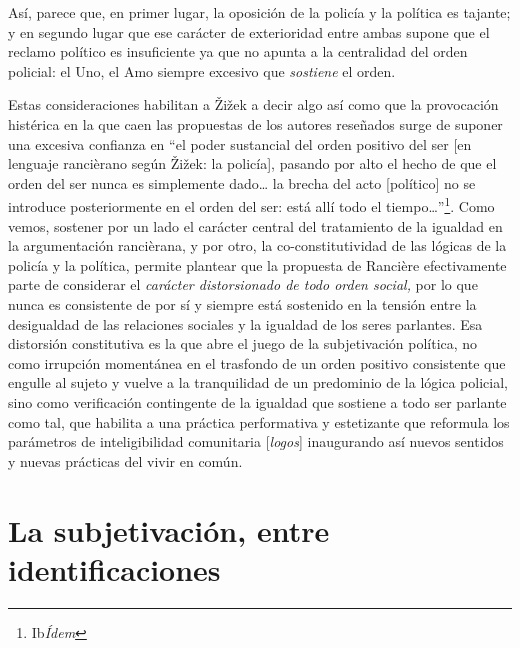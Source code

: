 Así, parece que, en primer lugar, la oposición de la policía y la política es tajante; y en segundo lugar que ese carácter de exterioridad entre ambas supone que el reclamo político es insuficiente ya que no apunta a la centralidad del orden policial: el Uno, el Amo siempre excesivo que \emph{sostiene} el orden.

Estas consideraciones habilitan a Žižek a decir algo así como que la provocación histérica en la que caen las propuestas de los autores reseñados surge de suponer una excesiva confianza en \enquote{el poder sustancial del orden positivo del ser {[}en lenguaje rancièrano según Žižek: la policía{]}, pasando por alto el hecho de que el orden del ser nunca es simplemente dado\ldots{} la brecha del acto {[}político{]} no se introduce posteriormente en el orden del ser: está allí todo el tiempo\ldots}\footnote{Ib\emph{Ídem}}. Como vemos, sostener por un lado el carácter central del tratamiento de la igualdad en la argumentación rancièrana, y por otro, la co-constitutividad de las lógicas de la policía y la política, permite plantear que la propuesta de Rancière efectivamente parte de considerar el \emph{carácter distorsionado de todo orden social,} por lo que nunca es consistente de por sí y siempre está sostenido en la tensión entre la desigualdad de las relaciones sociales y la igualdad de los seres parlantes. Esa distorsión constitutiva es la que abre el juego de la subjetivación política, no como irrupción momentánea en el trasfondo de un orden positivo consistente que engulle al sujeto y vuelve a la tranquilidad de un predominio de la lógica policial, sino como verificación contingente de la igualdad que sostiene a todo ser parlante como tal, que habilita a una práctica performativa y estetizante que reformula los parámetros de inteligibilidad comunitaria {[}\emph{logos}{]} inaugurando así nuevos sentidos y nuevas prácticas del vivir en común.

\section{La subjetivación, entre identificaciones}

